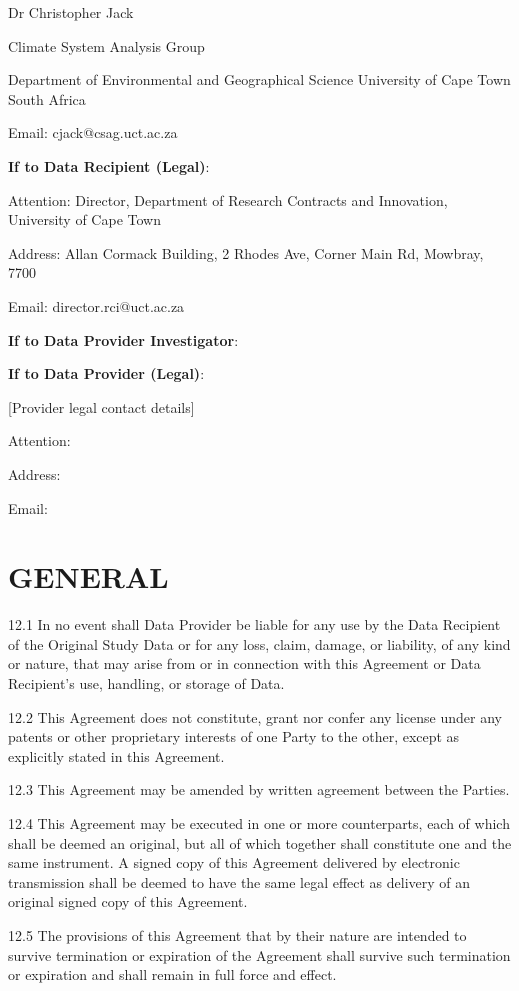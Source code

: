 Dr Christopher Jack

Climate System Analysis Group

Department of Environmental and Geographical Science University of Cape Town South Africa

Email: cjack@csag.uct.ac.za

\textbf{If to Data Recipient (Legal)}:

Attention: Director, Department of Research Contracts and Innovation, University of Cape Town

Address: Allan Cormack Building, 2 Rhodes Ave, Corner Main Rd, Mowbray, 7700

Email: director.rci@uct.ac.za

\textbf{If to Data Provider Investigator}:

\textbf{If to Data Provider (Legal)}:

[Provider legal contact details]

Attention:

Address:

Email:

\section{GENERAL}

12.1 In no event shall Data Provider be liable for any use by the Data Recipient of the Original Study Data or for any loss, claim, damage, or liability, of any kind or nature, that may arise from or in connection with this Agreement or Data Recipient's use, handling, or storage of Data.

12.2 This Agreement does not constitute, grant nor confer any license under any patents or other proprietary interests of one Party to the other, except as explicitly stated in this Agreement.

12.3 This Agreement may be amended by written agreement between the Parties.

12.4 This Agreement may be executed in one or more counterparts, each of which shall be deemed an original, but all of which together shall constitute one and the same instrument. A signed copy of this Agreement delivered by electronic transmission shall be deemed to have the same legal effect as delivery of an original signed copy of this Agreement.

12.5 The provisions of this Agreement that by their nature are intended to survive termination or expiration of the Agreement shall survive such termination or expiration and shall remain in full force and effect.

